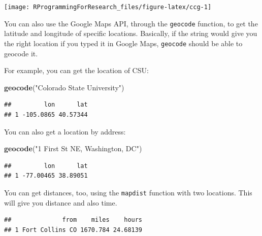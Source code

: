 \documentclass[]{book}
\makeatletter
\newenvironment{Shaded}{\begin{snugshade}}{\end{snugshade}}
\newcommand{\KeywordTok}[1]{\textcolor[rgb]{0.13,0.29,0.53}{\textbf{#1}}}
\newcommand{\StringTok}[1]{\textcolor[rgb]{0.31,0.60,0.02}{#1}}
\newcommand{\OperatorTok}[1]{\textcolor[rgb]{0.81,0.36,0.00}{\textbf{#1}}}
\newcommand{\NormalTok}[1]{#1}
\newenvironment{kframe}{%
\medskip{}
\setlength{\fboxsep}{.8em}
 \def\at@end@of@kframe{}%
 \ifinner\ifhmode%
  \def\at@end@of@kframe{\end{minipage}}%
  \begin{minipage}{\columnwidth}%
 \fi\fi%
 \def\FrameCommand##1{\hskip\@totalleftmargin \hskip-\fboxsep
 \colorbox{shadecolor}{##1}\hskip-\fboxsep
     \hskip-\linewidth \hskip-\@totalleftmargin \hskip\columnwidth}%
 \MakeFramed {\advance\hsize-\width
   \@totalleftmargin\z@ \linewidth\hsize
   \@setminipage}}%
 {\par\unskip\endMakeFramed%
 \at@end@of@kframe}
\renewenvironment{Shaded}{\begin{kframe}}{\end{kframe}}
\theoremstyle{definition}
\theoremstyle{definition}
\theoremstyle{definition}
\theoremstyle{remark}
\makeatother
\begin{document}
\begin{center}\texttt{[image: RProgrammingForResearch\_files/figure-latex/ccg-1]} \end{center}

You can also use the Google Maps API, through the \texttt{geocode}
function, to get the latitude and longitude of specific locations.
Basically, if the string would give you the right location if you typed
it in Google Maps, \texttt{geocode} should be able to geocode it.

For example, you can get the location of CSU:

\begin{Shaded}
\begin{Highlighting}[]
\KeywordTok{geocode}\NormalTok{(}\StringTok{"Colorado State University"}\NormalTok{)}
\end{Highlighting}
\end{Shaded}

\begin{verbatim}
##         lon      lat
## 1 -105.0865 40.57344
\end{verbatim}

You can also get a location by address:

\begin{Shaded}
\begin{Highlighting}[]
\KeywordTok{geocode}\NormalTok{(}\StringTok{"1 First St NE, Washington, DC"}\NormalTok{)}
\end{Highlighting}
\end{Shaded}

\begin{verbatim}
##         lon      lat
## 1 -77.00465 38.89051
\end{verbatim}

You can get distances, too, using the \texttt{mapdist} function with two
locations. This will give you distance and also time.

\begin{Shaded}
\end{Shaded}

\begin{verbatim}
##              from    miles    hours
## 1 Fort Collins CO 1670.784 24.68139
\end{verbatim}
\end{document}
